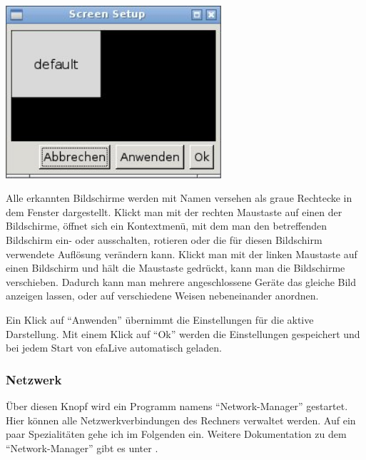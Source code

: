 \documentclass[a4paper,12pt,twoside]{article}
\begin{document}
\begin{minipage}{\linewidth}
    \centering
    \captionsetup{type=figure}
    \includegraphics[width=8cm]{screenshots/efaLivede-img22.jpg}
    \label{fig:bildschirm}
\end{minipage}
\bigskip

Alle erkannten Bildschirme werden mit Namen versehen als graue Rechtecke
in dem Fenster dargestellt. Klickt man mit der rechten Maustaste auf
einen der Bildschirme, öffnet sich ein Kontextmenü, mit dem man den
betreffenden Bildschirm ein- oder ausschalten, rotieren oder die für
diesen Bildschirm verwendete Auflösung verändern kann. Klickt man mit
der linken Maustaste auf einen Bildschirm und hält die Maustaste
gedrückt, kann man die Bildschirme verschieben. Dadurch kann man
mehrere angeschlossene Geräte das gleiche Bild anzeigen lassen, oder
auf verschiedene Weisen nebeneinander anordnen.

Ein Klick auf "`Anwenden"' übernimmt die
Einstellungen für die aktive Darstellung. Mit einem Klick auf
"`Ok"' werden die Einstellungen gespeichert
und bei jedem Start von efaLive automatisch geladen.


\subsubsection{Netzwerk}
\label{sct:dialog_netzwerk}
Über diesen Knopf wird ein Programm namens
"`Network-Manager"' gestartet. Hier können
alle Netzwerkverbindungen des Rechners verwaltet werden. Auf ein paar
Spezialitäten gehe ich im Folgenden ein. Weitere Dokumentation zu dem
"`Network-Manager"' gibt es unter \cite{NWM1}.
\end{document}
